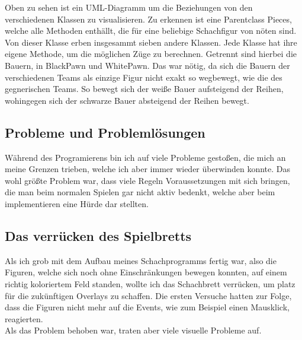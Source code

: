 \documentclass[a4paper, 10pt]{scrartcl}
\begin{document}
\begin{figure}[!h]
\begin{center}
\end{center}
\end{figure}

Oben zu sehen ist ein UML-Diagramm um die Beziehungen von den verschiedenen
Klassen zu visualisieren. Zu erkennen ist eine Parentclass \glqq{}Pieces\grqq ,
welche alle Methoden enthällt, die für eine beliebige Schachfigur von nöten sind.
Von dieser Klasse erben insgesammt sieben andere Klassen. Jede Klasse hat ihre eigene
Methode, um die möglichen Züge zu berechnen. Getrennt sind hierbei die Bauern, in
BlackPawn und WhitePawn. Das war nötig, da sich die Bauern der verschiedenen Teams als
einzige Figur nicht exakt so wegbewegt, wie die des gegnerischen Teams. So bewegt sich
der weiße Bauer aufsteigend der Reihen, wohingegen sich der schwarze Bauer absteigend der
Reihen bewegt. 

\pagebreak

\subsection{Probleme und Problemlösungen}
Während des Programierens bin ich auf viele Probleme gestoßen, die mich an meine Grenzen trieben, welche ich aber immer wieder überwinden konnte.
Das wohl größte Problem war, dass viele Regeln Voraussetzungen mit sich bringen, die man beim normalen Spielen gar nicht aktiv bedenkt, welche aber
beim implementieren eine Hürde dar stellten.

\subsection{Das verrücken des Spielbretts}
Als ich grob mit dem Aufbau meines Schachprogramms
fertig war, also die Figuren, welche sich noch ohne
Einschränkungen bewegen konnten, auf einem richtig koloriertem
Feld standen, wollte ich das Schachbrett verrücken, um platz für
die zukünftigen Overlays zu schaffen.
Die ersten Versuche hatten zur Folge, dass die Figuren nicht mehr auf die
Events, wie zum Beispiel einen Mausklick, reagierten.\\
Als das Problem behoben war, traten aber viele visuelle Probleme auf.
\end{document}
